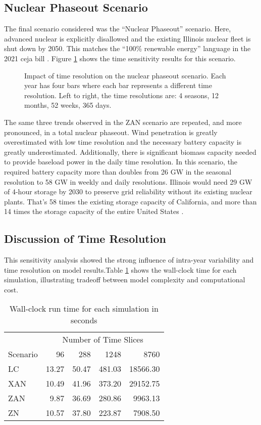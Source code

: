 \subsection{Nuclear Phaseout Scenario}
The final scenario considered was the ``Nuclear Phaseout'' scenario. Here, advanced
nuclear is explicitly disallowed and the existing Illinois nuclear fleet is shut down by
2050. This matches the ``100\% renewable energy'' language in the 2021 \gls{ceja} bill
\cite{harmon_climate_2021}. Figure \ref{fig:time_res_ZN} shows the time sensitivity
results for this scenario.

\begin{figure}[H]
  \centering
  \resizebox{0.95\columnwidth}{!}{}
  \caption{Impact of time resolution on the nuclear phaseout scenario.  Each
  year has four bars where each bar represents a different time resolution.
  Left to right, the time resolutions are: 4 seasons, 12 months, 52 weeks, 365 days.}
  \label{fig:time_res_ZN}
\end{figure}

The same three trends observed in the ZAN scenario are repeated, and
more pronounced, in a total nuclear phaseout. Wind penetration is greatly overestimated
with low time resolution and the necessary battery capacity is greatly underestimated.
Additionally, there is significant biomass capacity needed to provide baseload
power in the daily time resolution.
In this scenario, the required battery capacity more than doubles from 26 GW in the
seasonal resolution to 58 GW in weekly and daily resolutions. Illinois would need 29 GW of 4-hour
storage by 2030 to preserve grid reliability without its existing nuclear plants.
That's 58 times the existing storage capacity of California, and more than
14 times the storage capacity of the entire United States
\cite{hutchins_us_2021}.


\subsection{Discussion of Time Resolution}
This sensitivity analysis showed the strong influence of intra-year variability
and time resolution on model results.Table \ref{tab:time_res_clock} shows the
wall-clock time for each simulation, illustrating tradeoff between model
complexity and computational cost.

\begin{table}[H]
  \centering
  \caption{Wall-clock run time for each simulation in seconds}
  \label{tab:time_res_clock}
  \begin{tabular}{l*{4}{r}}
    \toprule
    & \multicolumn{4}{c}{Number of Time Slices}\\
    Scenario & 96 & 288 & 1248&8760\\
    \midrule
    LC &13.27&50.47&481.03&18566.30\\
    XAN &10.49&41.96&373.20&29152.75\\
    ZAN &9.87&36.69&280.86&9963.13\\
    ZN & 10.57&37.80&223.87&7908.50\\
    \bottomrule
  \end{tabular}
\end{table}


